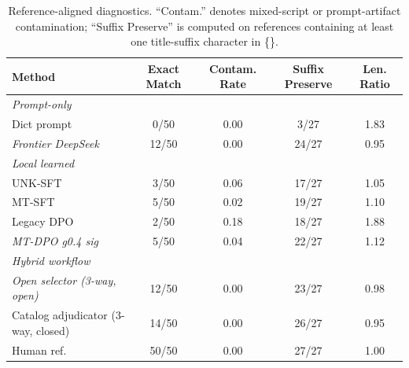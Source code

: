 \begin{table}[t]
\centering
\small
\begin{tabular}{lcccc}
\toprule
Method & Exact Match & Contam. Rate & Suffix Preserve & Len. Ratio \\
\midrule
\multicolumn{5}{l}{\textit{Prompt-only}} \\
Dict prompt & 0/50 & 0.00 & 3/27 & 1.83 \\
\textit{Frontier DeepSeek} & 12/50 & 0.00 & 24/27 & 0.95 \\
\midrule
\multicolumn{5}{l}{\textit{Local learned}} \\
UNK-SFT & 3/50 & 0.06 & 17/27 & 1.05 \\
MT-SFT & 5/50 & 0.02 & 19/27 & 1.10 \\
Legacy DPO & 2/50 & 0.18 & 18/27 & 1.88 \\
\textit{MT-DPO g0.4 sig} & 5/50 & 0.04 & 22/27 & 1.12 \\
\midrule
\multicolumn{5}{l}{\textit{Hybrid workflow}} \\
\textit{Open selector (3-way, open)} & 12/50 & 0.00 & 23/27 & 0.98 \\
Catalog adjudicator (3-way, closed) & 14/50 & 0.00 & 26/27 & 0.95 \\
\midrule
Human ref. & 50/50 & 0.00 & 27/27 & 1.00 \\
\bottomrule
\end{tabular}
\caption{Reference-aligned diagnostics. ``Contam.'' denotes mixed-script or prompt-artifact contamination; ``Suffix Preserve'' is computed on references containing at least one title-suffix character in \{\}.}
\label{tab:diagnostics}
\end{table}
